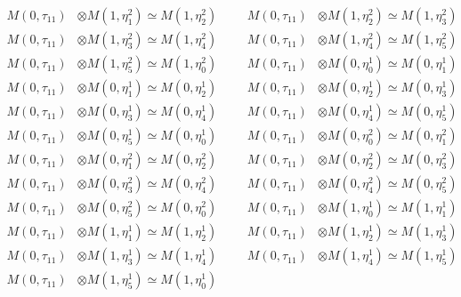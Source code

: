\begin{align*}
M(0,\tau_{11}) &\otimes M(1,\eta^{2}_{1}) \simeq M(1,\eta^{2}_{2}) &&& M(0,\tau_{11}) &\otimes M(1,\eta^{2}_{2}) \simeq M(1,\eta^{2}_{3})\\
M(0,\tau_{11}) &\otimes M(1,\eta^{2}_{3}) \simeq M(1,\eta^{2}_{4}) &&& M(0,\tau_{11}) &\otimes M(1,\eta^{2}_{4}) \simeq M(1,\eta^{2}_{5})\\
M(0,\tau_{11}) &\otimes M(1,\eta^{2}_{5}) \simeq M(1,\eta^{2}_{0}) &&& M(0,\tau_{11}) &\otimes M(0,\eta^{1}_{0}) \simeq M(0,\eta^{1}_{1})\\
M(0,\tau_{11}) &\otimes M(0,\eta^{1}_{1}) \simeq M(0,\eta^{1}_{2}) &&& M(0,\tau_{11}) &\otimes M(0,\eta^{1}_{2}) \simeq M(0,\eta^{1}_{3})\\
M(0,\tau_{11}) &\otimes M(0,\eta^{1}_{3}) \simeq M(0,\eta^{1}_{4}) &&& M(0,\tau_{11}) &\otimes M(0,\eta^{1}_{4}) \simeq M(0,\eta^{1}_{5})\\
M(0,\tau_{11}) &\otimes M(0,\eta^{1}_{5}) \simeq M(0,\eta^{1}_{0}) &&& M(0,\tau_{11}) &\otimes M(0,\eta^{2}_{0}) \simeq M(0,\eta^{2}_{1})\\
M(0,\tau_{11}) &\otimes M(0,\eta^{2}_{1}) \simeq M(0,\eta^{2}_{2}) &&& M(0,\tau_{11}) &\otimes M(0,\eta^{2}_{2}) \simeq M(0,\eta^{2}_{3})\\
M(0,\tau_{11}) &\otimes M(0,\eta^{2}_{3}) \simeq M(0,\eta^{2}_{4}) &&& M(0,\tau_{11}) &\otimes M(0,\eta^{2}_{4}) \simeq M(0,\eta^{2}_{5})\\
M(0,\tau_{11}) &\otimes M(0,\eta^{2}_{5}) \simeq M(0,\eta^{2}_{0}) &&& M(0,\tau_{11}) &\otimes M(1,\eta^{1}_{0}) \simeq M(1,\eta^{1}_{1})\\
M(0,\tau_{11}) &\otimes M(1,\eta^{1}_{1}) \simeq M(1,\eta^{1}_{2}) &&& M(0,\tau_{11}) &\otimes M(1,\eta^{1}_{2}) \simeq M(1,\eta^{1}_{3})\\
M(0,\tau_{11}) &\otimes M(1,\eta^{1}_{3}) \simeq M(1,\eta^{1}_{4}) &&& M(0,\tau_{11}) &\otimes M(1,\eta^{1}_{4}) \simeq M(1,\eta^{1}_{5})\\
M(0,\tau_{11}) &\otimes M(1,\eta^{1}_{5}) \simeq M(1,\eta^{1}_{0})
\end{align*}

